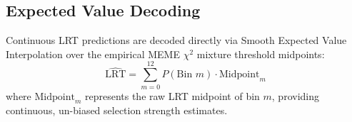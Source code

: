 \documentclass[11pt,a4paper]{article}
\begin{document}
\subsection{Expected Value Decoding}
Continuous LRT predictions are decoded directly via Smooth Expected Value Interpolation over the empirical MEME $\chi^2$ mixture threshold midpoints:
\begin{equation}
\hat{\text{LRT}} = \sum_{m=0}^{12} P(\text{Bin } m) \cdot \text{Midpoint}_m
\end{equation}
where $\text{Midpoint}_m$ represents the raw LRT midpoint of bin $m$, providing continuous, un-biased selection strength estimates.
\end{document}
